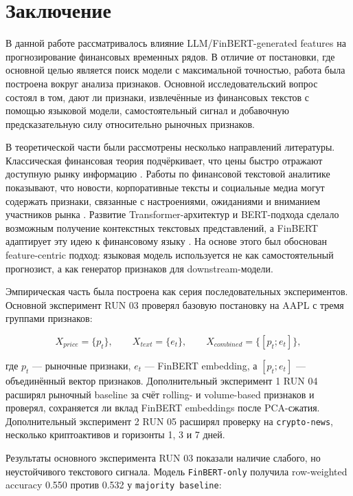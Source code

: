 \section{Заключение}

В данной работе рассматривалось влияние LLM/FinBERT-generated features на прогнозирование финансовых временных рядов. В отличие от постановки, где основной целью является поиск модели с максимальной точностью, работа была построена вокруг анализа признаков. Основной исследовательский вопрос состоял в том, дают ли признаки, извлечённые из финансовых текстов с помощью языковой модели, самостоятельный сигнал и добавочную предсказательную силу относительно рыночных признаков.

В теоретической части были рассмотрены несколько направлений литературы. Классическая финансовая теория подчёркивает, что цены быстро отражают доступную рынку информацию \cite{fama1970efficient}. Работы по финансовой текстовой аналитике показывают, что новости, корпоративные тексты и социальные медиа могут содержать признаки, связанные с настроениями, ожиданиями и вниманием участников рынка \cite{tetlock2007media,loughran2011liability,kearney2014textual,bollen2011twitter}. Развитие Transformer-архитектур и BERT-подхода сделало возможным получение контекстных текстовых представлений, а FinBERT адаптирует эту идею к финансовому языку \cite{vaswani2017attention,devlin2019bert,araci2019finbert,yang2020finbert}. На основе этого был обоснован feature-centric подход: языковая модель используется не как самостоятельный прогнозист, а как генератор признаков для downstream-модели.

Эмпирическая часть была построена как серия последовательных экспериментов. Основной эксперимент RUN 03 проверял базовую постановку на AAPL с тремя группами признаков:

\[
X_{price} = \{p_t\}, \qquad X_{text} = \{e_t\}, \qquad X_{combined} = \{[p_t;e_t]\},
\]

где $p_t$ --- рыночные признаки, $e_t$ --- FinBERT embedding, а $[p_t;e_t]$ --- объединённый вектор признаков. Дополнительный эксперимент 1 RUN 04 расширял рыночный baseline за счёт rolling- и volume-based признаков и проверял, сохраняется ли вклад FinBERT embeddings после PCA-сжатия. Дополнительный эксперимент 2 RUN 05 расширял проверку на \texttt{crypto-news}, несколько криптоактивов и горизонты 1, 3 и 7 дней.

Результаты основного эксперимента RUN 03 показали наличие слабого, но неустойчивого текстового сигнала. Модель \texttt{FinBERT-only} получила row-weighted accuracy 0.550 против 0.532 у \texttt{majority baseline}:


